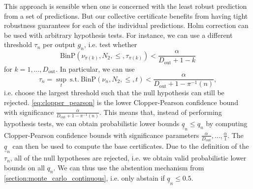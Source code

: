 This approach is sensible when one is concerned with the least robust prediction from a set of predictions.
But our collective certificate benefits from having tight robustness guarantees for each of the individual predictions.
Holm correction can be used with arbitrary hypothesis tests. For instance, we can use a different threshold $\tau_n$ per output $g_n$,
i.e. test whether
\begin{equation}
    \mathrm{BinP}\left(\nu_{\pi(k)}, N_2, \leq, \tau_{\pi(k)} \right) < \frac{\alpha}{D_\mathrm{out} + 1 - k}
\end{equation}
for $k = 1, \dots, D_\mathrm{out}$.
In particular, we can use
\begin{equation}\label{eq:clopper_pearson}
    \tau_n = \sup_t \ \text{s.t.} \ \mathrm{BinP}\left(\nu_n, N_2, \leq, t \right) < \frac{\alpha}{D_\mathrm{out} + 1 - \pi^{-1}(n)},
\end{equation}
i.e. choose the largest threshold such that the null hypothesis can still be rejected.
\autoref{eq:clopper_pearson} is the lower Clopper-Pearson confidence bound with significance $\frac{\alpha}{D_\mathrm{out} + 1 - \pi^{-1}(n)}$.
This means that, instead of performing hypothesis tests, we can obtain probabilistic lower bounds $\underline{q}_n \leq q_n$ by computing  Clopper-Pearson confidence bounds with significance parameters $\frac{\alpha}{D_\mathrm{out}}, \dots, \frac{\alpha}{1}$.
The $\underline{q}_n$ can then be used to compute the base certificates.
Due to the definition of the $\tau_n$, all of the null hypotheses are rejected, i.e. we obtain valid probabilistic lower bounds on all $q_n$. We can thus use the abstention mechanism from \autoref{section:monte_carlo_continuous}, i.e. only abstain if $\underline{q}_n \leq 0.5$.

\clearpage

